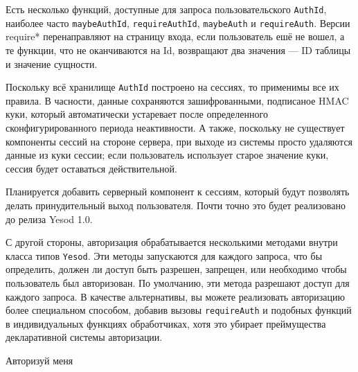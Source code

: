 Есть несколько функций, доступные для запроса пользовательского \lstinline'AuthId', наиболее часто \lstinline'maybeAuthId', \lstinline'requireAuthId', \lstinline'maybeAuth' и \lstinline'requireAuth'. Версии require* перенаправляют на страницу входа, если пользователь ешё не вошел, а те функции, что не оканчиваются на Id, возвращают два значения --- ID таблицы и значение сущности.

Поскольку всё хранилище \lstinline'AuthId' построено на сессиях, то применимы все их правила. В часности, данные сохраняются зашифрованными, подписаное HMAC куки, который автоматически устаревает после определенного сконфигурированного периода неактивности. А также, поскольку не существует компоненты сессий на стороне сервера, при выходе из системы просто удаляются данные из куки сессии; если пользователь использует старое значение куки, сессия будет оставаться действительной.

\begin{remark}
Планируется добавить серверный компонент к сессиям, который будут позволять делать принудительный выход пользователя. Почти точно это будет реализовано  до релиза Yesod 1.0.
\end{remark}

С другой стороны, авторизация обрабатывается несколькими методами внутри класса типов \lstinline'Yesod'. Эти методы запускаются для каждого запроса, что бы определить, должен ли доступ быть разрешен, запрещен, или необходимо чтобы пользователь был авторизован. По умолчанию, эти метода разрешают доступ для каждого запроса. В качестве альтернативы, вы можете реализовать авторизацию более специальном способом, добавив вызовы \lstinline'requireAuth' и подобных функций в индивидуальных функциях обработчиках, хотя это убирает преймущества декларативной системы авторизации.

Авторизуй меня

